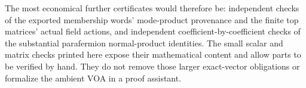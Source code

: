 The most economical further certificates would therefore be:
independent checks of the exported membership words' mode-product
provenance and the finite top matrices' actual field actions, and independent
coefficient-by-coefficient checks of the substantial parafermion
normal-product identities. The small scalar and matrix checks printed
here expose their mathematical content and allow parts to be
verified by hand. They do not remove those larger exact-vector
obligations or formalize the ambient VOA in a proof assistant.
